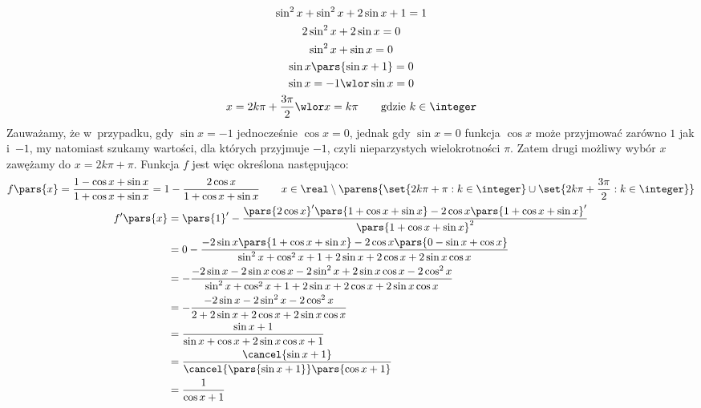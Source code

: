 \begin{itemize}
\begin{gather*}
            \sin^2x + \sin^2x + 2\sin x + 1 = 1\\
            2\sin^2x + 2\sin x = 0\\
            \sin^2x + \sin x = 0\\
            \sin x\pars{\sin x + 1} = 0\\
            \sin x = -1 \wlor \sin x = 0\\
            x = 2k\pi + \frac{3\pi}{2} \wlor x = k\pi \qquad \text{gdzie \(k \in \integer\)}
        \end{gather*}
        Zauważamy, że w~przypadku, gdy \(\sin x = -1\) jednocześnie \(\cos x = 0\), jednak gdy \(\sin x = 0\) funkcja \(\cos x\) może przyjmować zarówno \(1\) jak i~\(-1\), my natomiast szukamy wartości, dla których przyjmuje \(-1\), czyli nieparzystych wielokrotności \(\pi\). Zatem drugi możliwy wybór \(x\) zawężamy do \(x = 2k\pi + \pi\). Funkcja \(f\) jest więc określona następująco:
        \begin{gather*}
            f\pars{x} = \frac{1 - \cos x + \sin x}{1 + \cos x + \sin x} = 1 - \frac{2\cos x}{1 + \cos x + \sin x} \qquad x \in \real \setminus \parens{\set{2k\pi + \pi : k \in \integer} \cup \set{2k\pi + \frac{3\pi}{2} : k \in \integer}}\\
            \begin{split}
                f'\pars{x} &= \pars{1}' - \frac{\pars{2\cos x}'\pars{1 + \cos x + \sin x} - 2\cos x\pars{1 + \cos x + \sin x}'}{\pars{1 + \cos x + \sin x}^2}\\
                    &= 0 - \frac{-2\sin x\pars{1 + \cos x + \sin x} - 2\cos x\pars{0 - \sin x + \cos x}}{\sin^2 x + \cos^2 x + 1 + 2\sin x + 2\cos x + 2\sin x\cos x}\\
                    &= -\frac{-2\sin x - 2\sin x\cos x - 2\sin^2x + 2\sin x\cos x - 2\cos^2x}{\sin^2 x + \cos^2 x + 1 + 2\sin x + 2\cos x + 2\sin x\cos x}\\
                    &= -\frac{-2\sin x - 2\sin^2x - 2\cos^2x}{2 + 2\sin x + 2\cos x + 2\sin x\cos x}\\
                    &= \frac{\sin x + 1}{\sin x + \cos x + 2\sin x\cos x + 1}\\
                    &= \frac{\cancel{\sin x + 1}}{\cancel{\pars{\sin x + 1}}\pars{\cos x + 1}}\\
                    &= \frac{1}{\cos x + 1}
            \end{split}
        \end{gather*}
\end{itemize}

